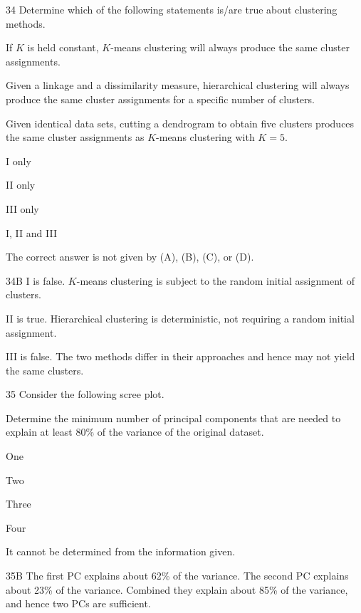 \begin{question}{34}
Determine which of the following statements is/are true about clustering methods.
\begin{statements}
\item If $K$ is held constant, $K$-means clustering will always produce the same cluster assignments.
\item Given a linkage and a dissimilarity measure, hierarchical clustering will always produce the same cluster assignments for a specific number of clusters.
\item Given identical data sets, cutting a dendrogram to obtain five clusters produces the same cluster assignments as $K$-means clustering with $K = 5$.
\end{statements}

\begin{choices}
\item I only
\item II only
\item III only
\item I, II and III
\item The correct answer is not given by (A), (B), (C), or (D).
\end{choices}
\end{question}
\begin{solution}{34}{B}
I is false. $K$-means clustering is subject to the random initial assignment of clusters.

II is true. Hierarchical clustering is deterministic, not requiring a random initial assignment.

III is false. The two methods differ in their approaches and hence may not yield the same clusters.
\end{solution}

\begin{question}{35}
Consider the following scree plot.


Determine the minimum number of principal components that are needed to explain at least 80\% of the variance of the original dataset.

\begin{choices}
\item One
\item Two
\item Three
\item Four
\item It cannot be determined from the information given.
\end{choices}
\end{question}
\begin{solution}{35}{B}
The first PC explains about 62\% of the variance. The second PC explains about 23\% of the variance. Combined they explain about 85\% of the variance, and hence two PCs are sufficient.
\end{solution}

